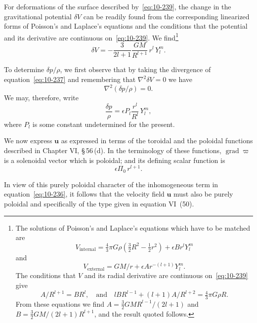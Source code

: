For deformations of the surface described by~\eqref{eq:10-239}, the change in the gravitational potential $\delta V$ can be readily found from the corresponding linearized forms of Poisson's and Laplace's equations and the conditions that the potential and its derivative are continuous on~\eqref{eq:10-239}. We find\footnote{The solutions of Poisson's and Laplace's equations which have to be matched are
\[
V_{\text{internal}} = \tfrac{4}{3}\pi G\rho(\tfrac{3}{2}R^2-\tfrac{1}{2}r^2)+\epsilon B r^l Y_l^m
\]
and
\[
V_{\text{external}} = GM/r + \epsilon A r^{-(l+1)} Y_l^m.
\]
The conditions that $V$ and its radial derivative are continuous on~\eqref{eq:10-239} give
\[
A/R^{l+1} = BR^l, \quad\text{and}\quad lBR^{l-1}+(l+1)A/R^{l+2} = \tfrac{4}{3}\pi G\rho R.
\]
From these equations we find
$A = \frac{3}{2} GM R^{l-1}/(2l+1)$ and $B = \frac{3}{2}GM/(2l+1)R^{l+1}$,
and the result quoted follows.}
\begin{equation}
\label{eq:10-240}
\delta V = -\frac{3}{2l+1}\frac{GM}{R^{l+1}}\,r^l\,Y_l^m.
\end{equation}

To determine $\delta p/\rho$, we first observe that by taking the divergence of equation~\eqref{eq:10-237} and remembering that $\nabla^2\delta V = 0$ we have
\begin{equation}
\label{eq:10-241}
\nabla^2(\delta p/\rho) = 0.
\end{equation}
We may, therefore, write
\begin{equation}
\label{eq:10-242}
\frac{\delta p}{\rho} = \epsilon P_l\frac{r^l}{R^l}\,Y_l^m,
\end{equation}
where $P_l$ is some constant undetermined for the present.

We now express $\mathbf{u}$ as expressed in terms of the toroidal and the poloidal functions described in Chapter VI, \S\,56\,(d). In the terminology of these functions, $\operatorname{grad}\varpi$ is a solenoidal vector which is poloidal; and its defining scalar function is
\begin{equation}
\label{eq:10-244}
\epsilon\Pi_0\,r^{l+1}.
\end{equation}

In view of this purely poloidal character of the inhomogeneous term in equation~\eqref{eq:10-236}, it follows that the velocity field $\mathbf{u}$ must also be purely poloidal and specifically of the type given in equation VI~(50).

